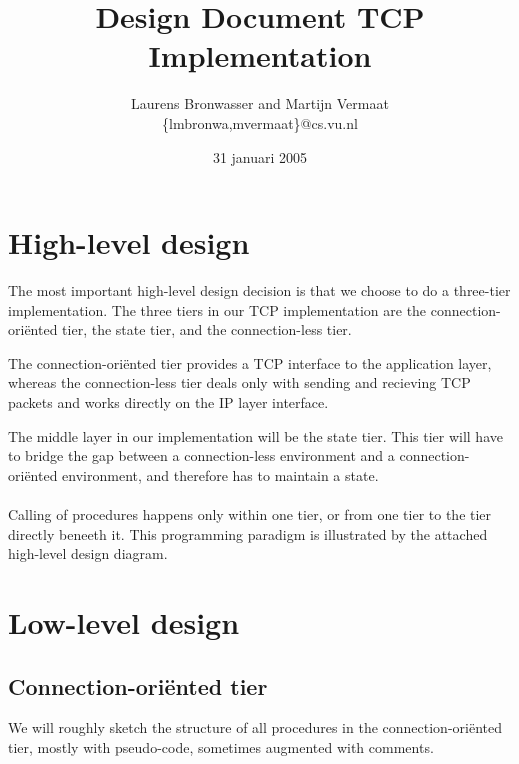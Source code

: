 \documentclass[11pt]{article}
\title{Design Document TCP Implementation}
\author{
    Laurens Bronwasser and Martijn Vermaat\\
    \{lmbronwa,mvermaat\}@cs.vu.nl
}
\date{31 januari 2005}
\begin{document}
\maketitle


\lstset{
  numbers=none,
  basicstyle=\small,
  frame=tb,
  language=C,
  captionpos=b
}


\section{High-level design}


The most important high-level design decision is that we choose to do a
three-tier implementation. The three tiers in our TCP implementation are
the connection-ori\"ented tier, the state tier, and the connection-less
tier.

The connection-ori\"ented tier provides a TCP interface to the application
layer, whereas the connection-less tier deals only with sending and
recieving TCP packets and works directly on the IP layer interface.

The middle layer in our implementation will be the state tier. This tier
will have to bridge the gap between a connection-less environment and a
connection-ori\"ented environment, and therefore has to maintain a state.

\paragraph{}

Calling of procedures happens only within one tier, or from one tier to
the tier directly beneeth it. This programming paradigm is illustrated by the 
attached high-level design diagram.


\section{Low-level design}


\subsection{Connection-ori\"ented tier}


We will roughly sketch the structure of all procedures in the
connection-ori\"ented tier, mostly with pseudo-code, sometimes
augmented with comments.


\paragraph{}
\end{document}
